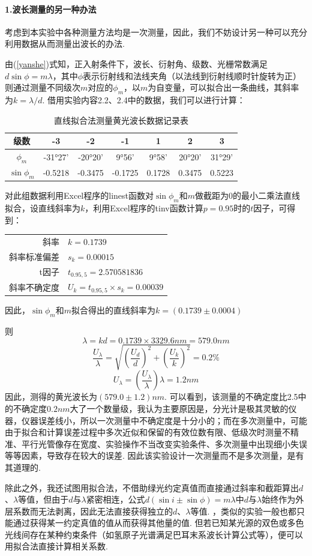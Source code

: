 \documentclass[UTF8]{ctexart}
\begin{document}
\paragraph{1.\quad 波长测量的另一种办法}\quad\par
考虑到本实验中各种测量方法均是一次测量，因此，我们不妨设计另一种可以充分利用数据从而测量出波长的办法.\par
由(\ref{yanshe})式知，正入射条件下，波长、衍射角、级数、光栅常数满足$d\sin \phi=m\lambda$，其中$\phi$表示衍射线和法线夹角（以法线到衍射线顺时针旋转为正）则通过测量不同级次$m$对应的$\phi_m$，以$m$为自变量，可以拟合出一条曲线，其斜率为$k=\lambda/d$. 
借用实验内容2.2、2.4中的数据，我们可以进行计算：
\begin{table}[H]\begin{center}
    \caption{直线拟合法测量黄光波长数据记录表}
    \begin{tabular}{|c|c|c|c|c|c|c|}
        \hline
        级数&-3&-2&-1&1&2&3\\
        \hline
        $\phi_m$&-31°27'&-20°20'&9°56'&9°58'&20°20'&31°29'\\
        \hline        
        $\sin\phi_m$&-0.5218&-0.3475&-0.1725&0.1728&0.3475&0.5223\\
        \hline
    \end{tabular}
\end{center}\end{table}
对此组数据利用Excel程序的linest函数对$\sin\phi_m$和$m$做截距为0的最小二乘法直线拟合，设直线斜率为$k$，利用Excel程序的tinv函数计算$p = 0.95$时的$t$因子，可得到：\par
\begin{center}\begin{tabular}{r l}
{斜率}& {$k=0.1739$}\\
{斜率标准偏差}& {$s_k=0.00015$}\\
{t因子}& {$t_{0.95,5}=2.570581836$}\\
{斜率不确定度}& {$U_k=t_{0.95,5}\times s_k = 0.00039$}
\end{tabular}\end{center}
因此，$\sin\phi_m$和$m$拟合得出的直线斜率为$k=(0.1739\pm0.0004)$\par
则
\[\lambda=kd=0.1739\times3329.6nm=579.0nm\]
\[\frac{U_{\lambda}}{\lambda}=\sqrt{(\frac{U_d}{d})^2+(\frac{U_k}{k})^2}=0.2\%\]
\[U_{\lambda}=(\frac{U_{\lambda}}{\lambda})\lambda=1.2nm\]
因此，测得的黄光波长为$(579.0\pm1.2)nm$. 可以看到，该测量的不确定度比2.5中的不确定度$0.2nm$大了一个数量级，我认为主要原因是，分光计是极其灵敏的仪器，仪器误差线小，所以一次测量中不确定度是十分小的；而在多次测量中，可能由于拟合和计算误差过程中多次近似和保留的有效位数有限、低级次时测量不精准、平行光管像存在宽度、实验操作不当改变实验条件、多次测量中出现细小失误等等因素，导致存在较大的误差. 因此该实验设计一次测量而不是多次测量，是有其道理的.\par
除此之外，我还试图用拟合法，不借助绿光约定真值而直接通过斜率和截距算出$d$、$\lambda$等值，但由于$d$与$\lambda$紧密相连，公式$d(\sin i\pm\sin\phi)=m\lambda$中$d$与$\lambda$始终作为外层系数而无法剥离，因此无法直接获得独立的$d$、$\lambda$等值. ，类似的实验一般也都只能通过获得某一约定真值的值从而获得其他量的值. 但若已知某光源的双色或多色光线间存在某种约束条件（如氢原子光谱满足巴耳末系波长计算公式等），便可以用拟合法直接计算相关系数.
\end{document}

